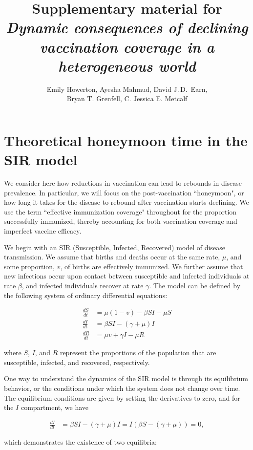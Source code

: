 \documentclass[12pt]{article}
\title{Supplementary material for \\ \textit{Dynamic consequences of declining vaccination coverage in a heterogeneous world}}
\author{Emily Howerton, Ayesha Mahmud, David J.\,D.\ Earn, \\Bryan T. Grenfell, C. Jessica E. Metcalf}
\date{}
\begin{document}
\maketitle
\linenumbers

\section{Theoretical honeymoon time in the SIR model}
\label{sec:sir-honeymoon}
We consider here how reductions in vaccination can lead to rebounds in disease prevalence. In particular, we will focus on the post-vaccination ``honeymoon", or how long it takes for the disease to rebound after vaccination starts declining. We use the term ``effective immunization coverage" throughout for the proportion successfully immunized, thereby accounting for both vaccination coverage and imperfect vaccine efficacy. 

We begin with an SIR (Susceptible, Infected, Recovered) model of disease transmission. We assume that births and deaths occur at the same rate, $\mu$, and some proportion, $v$, of births are effectively immunized. We further assume that new infections occur upon contact between susceptible and infected individuals at rate $\beta$, and infected individuals recover at rate $\gamma$. The model can be defined by the following system of ordinary differential equations: 

\begin{align}
    \frac{dS}{dt} &= \mu (1-v) - \beta S I - \mu S \\
    \frac{dI}{dt} &= \beta S I - (\gamma + \mu) I \\
    \frac{dR}{dt} &= \mu v + \gamma I - \mu R
\end{align}

\noindent
where $S$, $I$, and $R$ represent the proportions of the population that are susceptible, infected, and recovered, respectively.

One way to understand the dynamics of the SIR model is through its equilibrium behavior, or the conditions under which the system does not change over time. The equilibrium conditions are given by setting the derivatives to zero, and for the $I$ compartment, we have

\begin{align}
    \frac{dI}{dt} &= \beta S I - (\gamma + \mu) I = I(\beta S - (\gamma + \mu)) = 0,
\end{align}

\noindent
which demonstrates the existence of two equilibria: 
\end{document}

